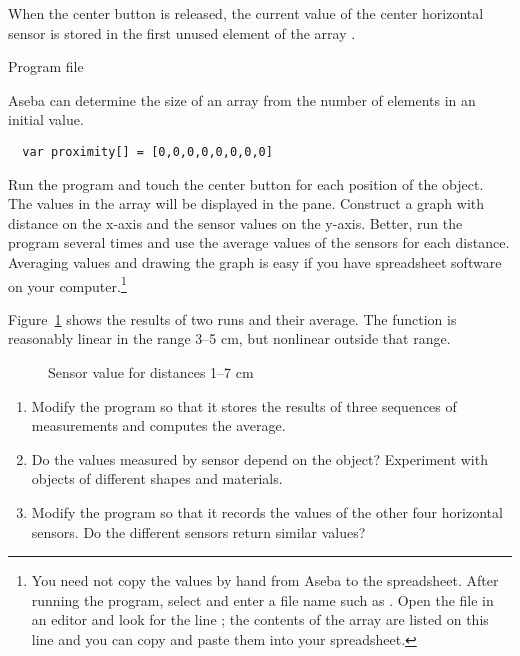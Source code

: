 
When the center button is released, the current value of the center
horizontal sensor is stored in the first unused element of the
array .


{\raggedleft \hfill Program file }

Aseba can determine the size of an array from the number of elements in
an initial value.

\begin{verbatim}
  var proximity[] = [0,0,0,0,0,0,0,0]
\end{verbatim}


Run the program and touch the center button for each position of the
object. The values in the array  will be displayed in the
 pane. Construct a graph with distance on the x-axis and
the sensor values on the y-axis. Better, run the program several times
and use the average values of the sensors for each distance. Averaging
values and drawing the graph is easy if you have spreadsheet software on
your computer.\footnote{You need not copy the values by hand from Aseba
to the spreadsheet. After running the program, select  and enter a file name such as . Open the
file  in an editor and look for the line
; the contents of the array are listed on this
line and you can copy and paste them into your spreadsheet.}

Figure~\ref{fig.nonlinear} shows the results of two runs and their
average. The function is reasonably linear in the range 3--5 cm, but
nonlinear outside that range.


\begin{figure}
\caption{Sensor value for distances 1--7 cm}\label{fig.nonlinear}
\end{figure}


\begin{enumerate}
\item Modify the program so that it stores the results of three
sequences of measurements and computes the average.

\item Do the values measured by sensor depend on the object?
Experiment with objects of different shapes and materials.

\item Modify the program so that it records the values of the other four
horizontal sensors. Do the different sensors return similar values?
 
\end{enumerate}

